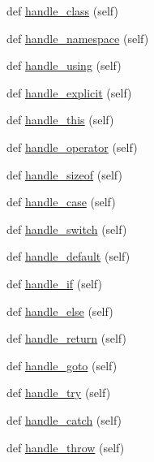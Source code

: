 \begin{DoxyCompactItemize}
\item 
def \hyperlink{classcpp_1_1ast_1_1AstBuilder_a93bd39632593bec36972355b7e1893e0}{handle\+\_\+class} (self)
\item 
def \hyperlink{classcpp_1_1ast_1_1AstBuilder_ae6dde01c5f9ac7ba3b14dff01cac66e4}{handle\+\_\+namespace} (self)
\item 
def \hyperlink{classcpp_1_1ast_1_1AstBuilder_a785563f31bc3ed9559d9ce2854a83f1b}{handle\+\_\+using} (self)
\item 
def \hyperlink{classcpp_1_1ast_1_1AstBuilder_a568860050542b53d3df9cf479f2a5e1c}{handle\+\_\+explicit} (self)
\item 
def \hyperlink{classcpp_1_1ast_1_1AstBuilder_ad96a39776b5439fa9a5c2989f8da20cd}{handle\+\_\+this} (self)
\item 
def \hyperlink{classcpp_1_1ast_1_1AstBuilder_a7ca1318675b9eff41cb4a838d63eb6e6}{handle\+\_\+operator} (self)
\item 
def \hyperlink{classcpp_1_1ast_1_1AstBuilder_acfd733ff9115e3292bea10e160bb6184}{handle\+\_\+sizeof} (self)
\item 
def \hyperlink{classcpp_1_1ast_1_1AstBuilder_ac4f02e1ba7df670086e4c9dabdb21458}{handle\+\_\+case} (self)
\item 
def \hyperlink{classcpp_1_1ast_1_1AstBuilder_a1dffcdf7154158461a652c5b885bfa19}{handle\+\_\+switch} (self)
\item 
def \hyperlink{classcpp_1_1ast_1_1AstBuilder_a6bf895d948d231ffcd058df7af05d0be}{handle\+\_\+default} (self)
\item 
def \hyperlink{classcpp_1_1ast_1_1AstBuilder_a39f2561dfcf36485b2050dff258ece2b}{handle\+\_\+if} (self)
\item 
def \hyperlink{classcpp_1_1ast_1_1AstBuilder_aeb676b03467a93454be018ac243f89a2}{handle\+\_\+else} (self)
\item 
def \hyperlink{classcpp_1_1ast_1_1AstBuilder_a8330d1f34d40b0e82495ec794575289d}{handle\+\_\+return} (self)
\item 
def \hyperlink{classcpp_1_1ast_1_1AstBuilder_a8504d788bb1541ee581918d52d1f4132}{handle\+\_\+goto} (self)
\item 
def \hyperlink{classcpp_1_1ast_1_1AstBuilder_a6c7998f3fdcd046718ff809dbe257645}{handle\+\_\+try} (self)
\item 
def \hyperlink{classcpp_1_1ast_1_1AstBuilder_aa38687383d0f54d26416054cf2141837}{handle\+\_\+catch} (self)
\item 
def \hyperlink{classcpp_1_1ast_1_1AstBuilder_ad4a308ded4a1f87e686b9e11fec31be9}{handle\+\_\+throw} (self)

\end{DoxyCompactItemize}
